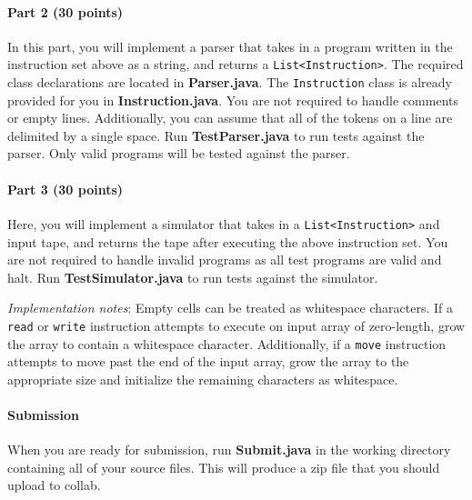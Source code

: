 \documentclass[10pt]{article}
\begin{document}
\paragraph{Part 2 (30 points)}  In this part, you will implement a parser that takes in a program written in the instruction set above as a string, and returns a \texttt{List<Instruction>}. The required class declarations are located in \textbf{Parser.java}. The \texttt{Instruction} class is already provided for you in \textbf{Instruction.java}. You are not required to handle comments or empty lines. Additionally, you can assume that all of the tokens on a line are delimited by a single space. Run \textbf{TestParser.java} to run tests against the parser. Only valid programs will be tested against the parser.

\paragraph{Part 3 (30 points)} Here, you will implement a simulator that takes in a \texttt{List<Instruction>} and input tape, and returns the tape after executing the above instruction set. You are not required to handle invalid programs as all test programs are valid and halt. Run \textbf{TestSimulator.java} to run tests against the simulator.\par
\textit{Implementation notes}: Empty cells can be treated as whitespace characters. If a \texttt{read} or \texttt{write} instruction attempts to execute on input array of zero-length, grow the array to contain a whitespace character. Additionally, if a \texttt{move} instruction attempts to move past the end of the input array, grow the array to the appropriate size and initialize the remaining characters as whitespace.\par

\paragraph{Submission} When you are ready for submission, run \textbf{Submit.java} in the working directory containing all of your source files. This will produce a zip file that you should upload to collab.





\end{document}
